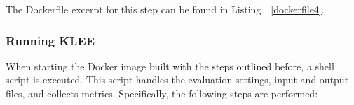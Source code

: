 \documentclass{article}
\let\savedRef=\ref
\renewcommand{\ref}{\unskip~\savedRef}
\begin{document}
\begin{multicols}{2}
    The Dockerfile excerpt for this step can be found in Listing~\ref{dockerfile4}.

\end{multicols}

\begin{multicols}{2}

    \subsubsection{Running KLEE}
    \label{analyze.sh}
    When starting the Docker image built with the steps outlined before, a shell script is executed. This script handles the evaluation settings, input and output files, and collects metrics. Specifically, the following steps are performed:


\end{multicols}
\end{document}
